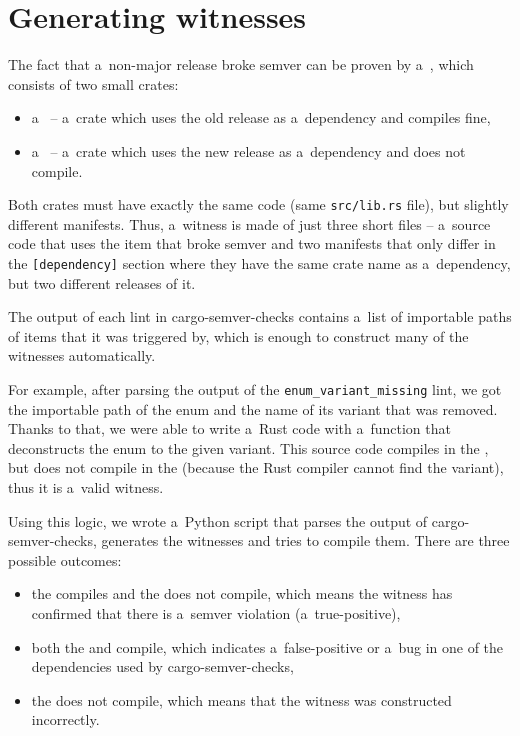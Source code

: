 \documentclass[licencjacka,en]{pracamgr}
\begin{document}
\section{Generating witnesses}\label{r:section_generating_witnesses}

The fact that a~non-major release broke semver can be proven by a~,
which consists of two small crates:
\begin{itemize}
	\item a~ -- a~crate which uses the old release as a~dependency
		and compiles fine,
	\item a~ -- a~crate which uses the new release as a~dependency
		and does not compile.
\end{itemize}
Both crates must have exactly the same code (same \texttt{src/lib.rs} file),
but slightly different manifests.
Thus, a~witness is made of just three short files -- a~source code that uses the item that
broke semver and two manifests that only differ in the \texttt{[dependency]} section
where they have the same crate name as a~dependency, but two different releases of it.

The output of each lint in cargo-semver-checks contains a~list of importable paths
of items that it was triggered by, which is enough to construct many of the witnesses automatically.

For example, after parsing the output of the \texttt{enum\_variant\_missing} lint,
we got the importable path of the enum and the name of its variant that was removed.
Thanks to that, we were able to write a~Rust code with a~function that deconstructs the enum
to the given variant. This source code compiles in the , but does not compile
in the  (because the Rust compiler cannot find the variant), thus it is a~valid witness.

Using this logic, we wrote a~Python script that parses the output of cargo-semver-checks,
generates the witnesses and tries to compile them.
There are three possible outcomes:
\begin{itemize}
	\item the  compiles and the  does not compile, which means the witness has confirmed that there is a~semver violation (a~true-positive),
	\item both the  and  compile, which indicates a~false-positive or a~bug in one of the dependencies used by cargo-semver-checks,
	\item the  does not compile, which means that the witness was constructed incorrectly.
\end{itemize}
\end{document}
